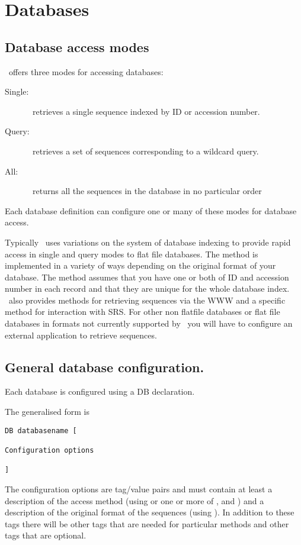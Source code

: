 \documentclass{report}
\begin{document}
\section{Databases}
	\subsection{Database access modes}

\EMBOSS\ offers three modes for accessing databases:
\begin{description}
       \item[Single:]\EMBOSS\ retrieves a single sequence indexed by ID or accession number.
       \item[Query:]\EMBOSS\ retrieves a set of sequences corresponding to a wildcard query.
       \item[All:]\EMBOSS\ returns all the sequences in the database in no particular order
\end{description}

Each database definition can configure one or many of these modes for database access.

Typically \EMBOSS\ uses variations on the  system of database indexing to provide rapid access in single and query modes to flat file databases. The  method is implemented in a variety of ways depending on the original format of your database.
The  method assumes that you have one or both of ID and accession number in each record and that they are unique for the whole database index. 
\EMBOSS\ also provides methods for retrieving sequences via the WWW and a specific method for interaction with SRS.
For other non flatfile databases or flat file databases in formats not currently supported by \EMBOSS\ you will have to configure an external application to retrieve sequences.

\subsection{General database configuration.}

Each database is configured using a DB declaration.

The generalised form is 
\begin{verbatim}
DB databasename [

Configuration options

]
\end{verbatim}

The configuration options are tag/value pairs and must contain at least a description of the access method (using  or one or more of ,  and ) and a description of the original format of the sequences (using ). 
In addition to these tags there will be other tags that are needed for particular methods and other tags that are optional.
\end{document}
